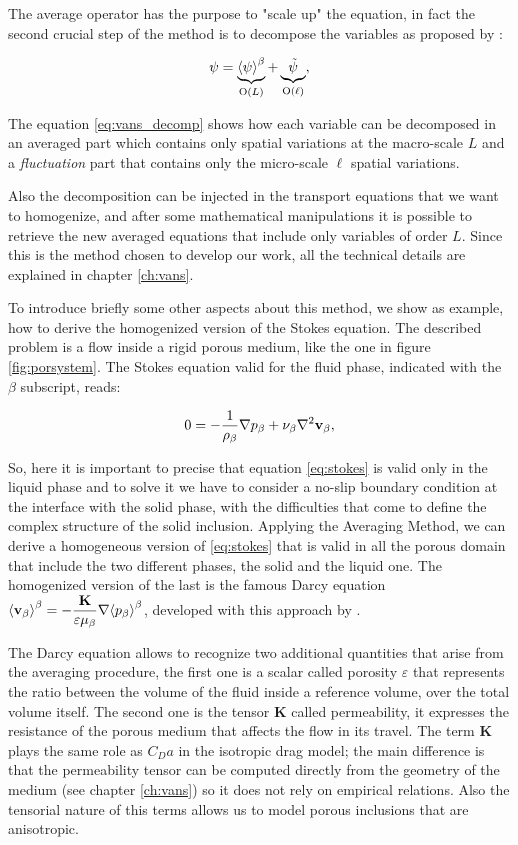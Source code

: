 The average operator has the purpose to "scale up" the equation, in fact the second crucial step of the method is to decompose the variables as proposed by \citet{gray1975derivation}:

\begin{equation}
\psi =   \underbrace{ {\left< \psi \right>}^{\beta} }_\text{O($L$)}  +  \underbrace{\tilde{\psi} }_\text{O($\ell$)},
\label{eq:vans_decomp}
\end{equation}

The equation \eqref{eq:vans_decomp} shows how each variable can be decomposed in an averaged part which contains only spatial variations at the macro-scale $L$ and a \textit{fluctuation} part that contains only the micro-scale $\ell$ spatial variations.

Also the decomposition can be injected in the transport equations that we want to homogenize, and after some mathematical manipulations it is possible to retrieve the new averaged equations that include only variables of order $L$.
Since this is the method chosen to develop our work, all the technical details are explained in chapter \ref{ch:vans}.

To introduce briefly some other aspects about this method, we show as example, how to derive the homogenized version of the Stokes equation. The described problem is a flow inside a rigid porous medium, like the one in figure \ref{fig:porsystem}.
The Stokes equation valid for the fluid phase, indicated with the $\beta$ subscript, reads:

\begin{equation}
0 = -\dfrac{1}{\rho_{\beta}} \nabla p_{\beta} +\nu_{\beta} \nabla^2 \textbf{v}_{\beta},
\label{eq:stokes}
\end{equation} 

So, here it is important to precise that equation \eqref{eq:stokes} is valid only in the liquid phase and to solve it we have to consider a no-slip boundary condition at the interface with the solid phase, with the difficulties that come to define the complex structure of the solid inclusion.
Applying the Averaging Method, we can derive a homogeneous version of \eqref{eq:stokes} that is valid in all the porous domain that include the two different phases, the solid and the liquid one.
The homogenized version of the last is the famous Darcy equation ${\left< \textbf{v}_{\beta} \right>}^{\beta} = -\dfrac{ \mathbf{K} }{\varepsilon \mu_{\beta}} \nabla {\left< p_{\beta} \right>}^{\beta}$, developed with this approach by  \citet{whitaker1986flow}.

The Darcy equation allows to recognize two additional quantities that arise from the averaging procedure, the first one is a scalar called porosity $\varepsilon$ that represents the ratio between the volume of the fluid inside a reference volume, over the total volume itself.
The second one is the tensor $\mathbf{K}$ called permeability, it expresses the resistance of the porous medium that affects the flow in its travel.
The term $\mathbf{K}$ plays the same role as $C_D a$ in the isotropic drag model; the main difference is that the permeability tensor can be computed directly from the geometry of the medium (see chapter \ref{ch:vans}) so it does not rely on empirical relations.
Also the tensorial nature of this terms allows us to model porous inclusions that are anisotropic.

